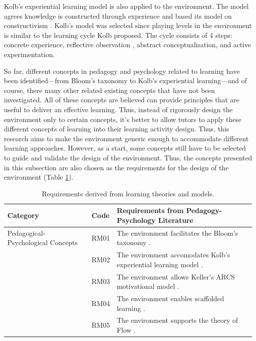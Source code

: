 \documentclass[10pt, a4paper]{report} \usepackage[titletoc]{appendix}
\begin{document}
Kolb's experiential learning model \cite{kolb2014experiential} is also applied to the environment. The model agrees knowledge is constructed through experience and based its model on constructivism \cite{kolb2014experiential}. Kolb's model was selected since playing levels in the environment is similar to the learning cycle Kolb proposed. The cycle consists of 4 steps: concrete experience, reflective observation , abstract conceptualisation, and active experimentation. 

So far, different concepts in pedagogy and psychology related to learning have been identified---from Bloom's taxonomy to Kolb's experiential learning---and of course, there many other related existing concepts that have not been investigated. All of these concepts are believed can provide principles that are useful to deliver an effective learning. Thus, instead of rigorously design the environment only to certain concepts, it's better to allow tutors to apply these different concepts of learning into their learning activity design. Thus, this research aims to make the environment generic enough to accommodate different learning approaches. However, as a start, some concepts still have to be selected to guide and validate the design of the environment. Thus, the concepts presented in this subsection are also chosen as the requirements for the design of the environment (Table \ref{design-learning-models}).

\begin{table}[t!]
\caption{Requirements derived from learning theories and models.}
\label{design-learning-models}
\begin{center}
\begin{tabular}{ p{2.3cm}p{1cm}p{9.7cm} } 
\hline
Category & Code & Requirements from Pedagogy-Psychology Literature\\
\hline
\multirow{1}{2cm}{Pedagogical-Psychological Concepts} 
& RM01 & The environment facilitates the Bloom's taxonomy \cite{krathwohl2002revision}. \\
& RM02 & The environment accomodates Kolb's experiential learning model \cite{kolb2014experiential}. \\ 
& RM03 & The environment allows Keller's ARCS motivational model \cite{keller2010motivational}. \\
& RM04 & The environment enables scaffolded learning \cite{vygotsky1978mind, wood1976role}. \\
& RM05 & The environment supports the theory of Flow \cite{csikszentmihalyi2014toward}. \\ 
\hline
\end{tabular}
\end{center}
\end{table}
\end{document}
